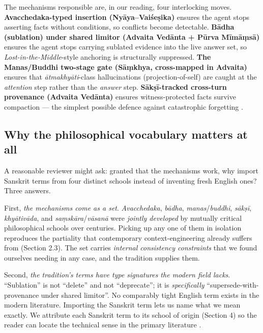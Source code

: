 The mechanisms responsible are, in our reading, four interlocking moves. \textbf{Avacchedaka-typed insertion (Nyāya--Vaiśeṣika)} ensures the agent stops asserting facts without conditions, so conflicts become detectable. \textbf{Bādha (sublation) under shared limitor (Advaita Vedānta + Pūrva Mīmāṃsā)} ensures the agent stops carrying sublated evidence into the live answer set, so \emph{Lost-in-the-Middle}-style anchoring is structurally suppressed. \textbf{The Manas/Buddhi two-stage gate (Sāṃkhya, cross-mapped in Advaita)} ensures that \emph{ātmakhyāti}-class hallucinations (projection-of-self) are caught at the \emph{attention} step rather than the \emph{answer} step. \textbf{Sākṣī-tracked cross-turn provenance (Advaita Vedānta)} ensures witness-protected facts survive compaction --- the simplest possible defence against catastrophic forgetting \citep{french1999catastrophic, kirkpatrick2017overcoming, parisi2019continual}.

\subsection{Why the philosophical vocabulary matters at all}\label{why-the-philosophical-vocabulary-matters-at-all}

A reasonable reviewer might ask: granted that the mechanisms work, why import Sanskrit terms from four distinct schools instead of inventing fresh English ones? Three answers.

First, \emph{the mechanisms come as a set}. \emph{Avacchedaka}, \emph{bādha}, \emph{manas}/\emph{buddhi}, \emph{sākṣī}, \emph{khyātivāda}, and \emph{saṃskāra}/\emph{vāsanā} were \emph{jointly developed} by mutually critical philosophical schools over centuries. Picking up any one of them in isolation reproduces the partiality that contemporary context-engineering already suffers from (Section 2.3). The set carries \emph{internal consistency constraints} that we found ourselves needing in any case, and the tradition supplies them.

Second, \emph{the tradition's terms have type signatures the modern field lacks}. ``Sublation'' is not ``delete'' and not ``deprecate''; it is \emph{specifically} ``supersede-with-provenance under shared limitor''. No comparably tight English term exists in the modern literature. Importing the Sanskrit term lets us name what we mean exactly. We attribute each Sanskrit term to its school of origin (Section 4) so the reader can locate the technical sense in the primary literature \citep{matilal1986perception, ganeri2001philosophy, phillips2012epistemology}.

